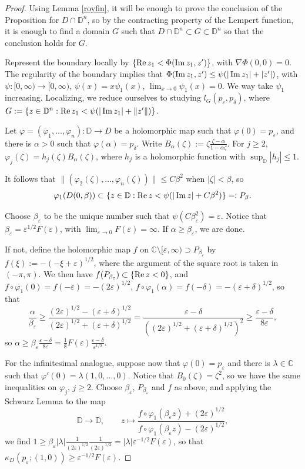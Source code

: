 \documentclass[10pt,a4paper]{amsart}
\def\C{\mathbb C}
\def\D{\mathbb D}
\renewcommand{\Im}{\operatorname{\rm{Im}}}
\renewcommand{\Re}{\operatorname{\rm{Re}}}
\newcommand{\eps}{\varepsilon}
\begin{document}
\begin{proof}
Using Lemma \ref{royfin}, it will be enough to prove the conclusion of the Proposition for  $D \cap \D^n$,
so by the contracting property of the Lempert function, 
it is enough to find a domain $G$ such that  $D \cap \D^n \subset G \subset \D^n$
so that the conclusion holds for $G$.

Represent the boundary locally by $\{ \Re z_1 < \Phi (\Im z_1, z')\}$,
with $\nabla \Phi(0,0)=0$.
The regularity of the boundary  implies that
$\Phi (\Im z_1, z') \le \psi(|\Im z_1|+|z'|)$, with $\psi: [0,\infty) \longrightarrow [0,\infty)$,
$\psi(x)=x\psi_1(x)$, $\lim_{x\to0}\psi_1(x)=0$. We way take $\psi_1$ increasing.
Localizing, we reduce ourselves to studying $l_G(p_\eps,p_\delta)$,
where $G:= \{ z \in \D^n: \Re z_1 < \psi(|\Im z_1|+\|z'\|) \}$.

Let $\varphi=(\varphi_1, \dots, \varphi_n): \D \longrightarrow D$ be 
a holomorphic map such that $\varphi (0)=  p_\eps$,
and there is $\alpha>0$ such that $\varphi(\alpha)= p_\delta$. 
Write $B_\alpha (\zeta):= \zeta \frac{\zeta-\alpha}{1-\alpha \zeta}$.
For $j\ge 2$, $\varphi_j(\zeta) = h_j(\zeta) B_\alpha (\zeta)$,
 where $h_j$ is a holomorphic function with $\sup_{\D} |h_j| \le 1$.

It follows that $\|(\varphi_2(\zeta),\dots,\varphi_n(\zeta))\|\le C \beta^2$ when $|\zeta|<\beta$,
so
\[
\varphi_1(D(0,\beta)) \subset
\{ z\in \D: \Re z < \psi(|\Im z|+C\beta^2)\}=:P_\beta.
\]

Choose $\beta_\eps$ to be the unique number such that
$\psi(C \beta_\eps^2)=\eps$.  Notice that $\beta_\eps = \eps^{1/2} F(\eps)$, with $\lim_{\eps\to0} F(\eps)=\infty$. If $\alpha\ge \beta_\eps$, we are done.

If not, define the holomorphic map $f$ on $\C\setminus  [\eps,\infty) \supset P_{\beta_\eps}$
by $f(\xi):=-(-\xi+\eps)^{1/2}$,
where the argument of the square root is taken in $(-\pi,\pi)$.
We then have $f(P_{\beta_\eps})\subset \{\Re z <0\}$, and 
$f\circ \varphi_1 (0) = f(-\eps)= - (2\eps)^{1/2}$,
$f\circ \varphi_1 (\alpha) = f(-\delta)= - (\eps+\delta)^{1/2}$,
so that
\[
\frac{\alpha}{\beta_\eps} \ge
\frac{(2\eps)^{1/2}-(\eps+\delta)^{1/2}}{(2\eps)^{1/2}+(\eps+\delta)^{1/2}}
=
\frac{\eps-\delta}{((2\eps)^{1/2}+(\eps+\delta)^{1/2})^2}
\ge
\frac{\eps-\delta}{8\eps} ,
\]
so $\alpha \ge \beta_\eps \frac{\eps-\delta}{8\eps} = \frac18 F(\eps)\frac{\eps-\delta}{\eps^{1/2}}$.

\smallskip

For the infinitesimal analogue, suppose now that $\varphi(0)=p_\eps$
and there is $\lambda \in \C$ such that $\varphi'(0)=\lambda (1,0,\dots,0)$.
Notice that $B_0(\zeta)=\zeta^2$, so we have the same inequalities on
$\varphi_j$, $j\ge 2$. Choose $\beta_\eps$, $P_{\beta_\eps}$ and $f$ as above,
and applying the Schwarz Lemma to the map
\[
\D \longrightarrow \D, \qquad 
z\mapsto \frac{f\circ \varphi_1 (\beta_\eps z) + (2\eps)^{1/2}}{f\circ \varphi_1 (\beta_\eps z) - (2\eps)^{1/2}},
\]
we find $1 \ge \beta_\eps |\lambda| \frac{1}{(2\eps)^{1/2}} \frac{1}{(2\eps)^{1/2}}= |\lambda| \eps^{-1/2} F(\eps)$, so that $\kappa_D (p_\eps; (1,0))\ge  \eps^{-1/2} F(\eps)$.
\end{proof}
\end{document}

